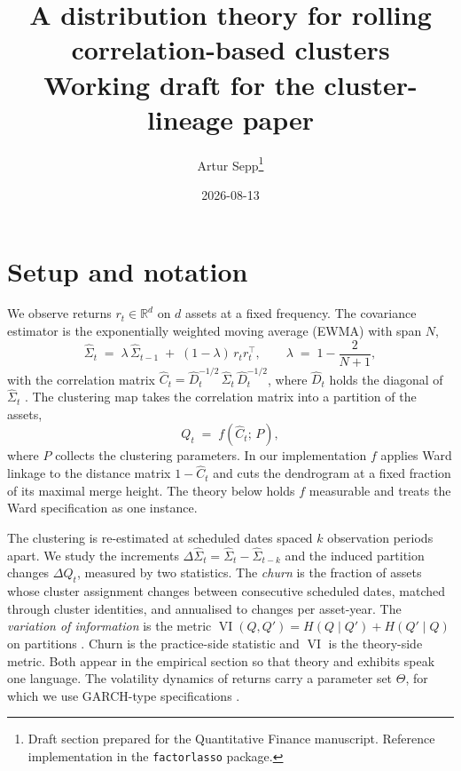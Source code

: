 \documentclass[11pt]{article}
\title{A distribution theory for rolling correlation-based clusters\\
\large Working draft for the cluster-lineage paper}
\author{Artur Sepp\thanks{Draft section prepared for the Quantitative Finance
manuscript. Reference implementation in the \texttt{factorlasso} package.}}
\date{2026-08-13}
\theoremstyle{remark}
\newcommand{\R}{\mathbb{R}}
\newcommand{\VI}{\operatorname{VI}}
\begin{document}
\maketitle

\section{Setup and notation}

We observe returns $r_t \in \R^d$ on $d$ assets at a fixed frequency. The
covariance estimator is the exponentially weighted moving average (EWMA) with
span $N$,
\begin{equation}
\widehat{\Sigma}_t \;=\; \lambda\, \widehat{\Sigma}_{t-1}
\;+\; (1-\lambda)\, r_t r_t^{\top},
\qquad \lambda \;=\; 1 - \frac{2}{N+1},
\label{eq:ewma}
\end{equation}
with the correlation matrix
$\widehat{C}_t = \widehat{D}_t^{-1/2}\, \widehat{\Sigma}_t\, \widehat{D}_t^{-1/2}$,
where $\widehat{D}_t$ holds the diagonal of $\widehat{\Sigma}_t$
\citep{riskmetrics1996}. The clustering map takes the correlation matrix into a
partition of the assets,
\begin{equation}
Q_t \;=\; f\!\left(\widehat{C}_t;\, P\right),
\label{eq:clustermap}
\end{equation}
where $P$ collects the clustering parameters. In our implementation $f$ applies
Ward linkage \citep{ward1963hierarchical} to the distance matrix
$1-\widehat{C}_t$ and cuts the dendrogram at a fixed fraction of its maximal
merge height. The theory below holds $f$ measurable and treats the Ward
specification as one instance.

The clustering is re-estimated at scheduled dates spaced $k$ observation
periods apart. We study the increments
$\Delta\widehat{\Sigma}_t = \widehat{\Sigma}_t - \widehat{\Sigma}_{t-k}$ and the
induced partition changes $\Delta Q_t$, measured by two statistics. The
\emph{churn} is the fraction of assets whose cluster assignment changes between
consecutive scheduled dates, matched through cluster identities, and annualised
to changes per asset-year. The \emph{variation of information} is the metric
$\VI(Q, Q') = H(Q \mid Q') + H(Q' \mid Q)$ on partitions \citep{meila2007comparing}.
Churn is the practice-side statistic and $\VI$ is the theory-side metric. Both
appear in the empirical section so that theory and exhibits speak one language.
The volatility dynamics of returns carry a parameter set $\Theta$, for which we
use GARCH-type specifications \citep{bollerslev1986generalized}.
\end{document}
